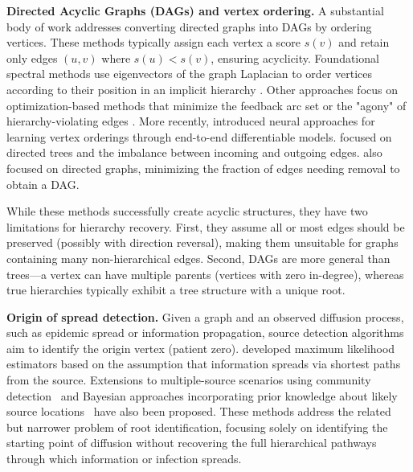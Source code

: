 \documentclass{article}
\begin{document}
    \textbf{Directed Acyclic Graphs (DAGs) and vertex ordering.} A substantial body of work addresses converting directed graphs into DAGs by ordering vertices. These methods typically assign each vertex a score $s(v)$ and retain only edges $(u,v)$ where $s(u) < s(v)$, ensuring acyclicity. Foundational spectral methods use eigenvectors of the graph Laplacian to order vertices according to their position in an implicit hierarchy \citep{fiedler1975property}. Other approaches focus on optimization-based methods that minimize the feedback arc set or the "agony" of hierarchy-violating edges \citep{gupte2011finding}. More recently, \citet{zhang2021neural} introduced neural approaches for learning vertex orderings through end-to-end differentiable models. \citet{muchnik2007self} focused on directed trees and the imbalance between incoming and outgoing edges. \citet{rosen2014directionality} also focused on directed graphs, minimizing the fraction of edges needing removal to obtain a DAG.

    While these methods successfully create acyclic structures, they have two limitations for hierarchy recovery. First, they assume all or most edges should be preserved (possibly with direction reversal), making them unsuitable for graphs containing many non-hierarchical edges. Second, DAGs are more general than trees—a vertex can have multiple parents (vertices with zero in-degree), whereas true hierarchies typically exhibit a tree structure with a unique root.

    \textbf{Origin of spread detection.} Given a graph and an observed diffusion process, such as epidemic spread or information propagation, source detection algorithms aim to identify the origin vertex (patient zero). \citet{shah2011rumors} developed maximum likelihood estimators based on the assumption that information spreads via shortest paths from the source. Extensions to multiple-source scenarios using community detection~\citep{zang2014discovering} and Bayesian approaches incorporating prior knowledge about likely source locations~\citep{ling2022source} have also been proposed. These methods address the related but narrower problem of root identification, focusing solely on identifying the starting point of diffusion without recovering the full hierarchical pathways through which information or infection spreads.
\end{document}
